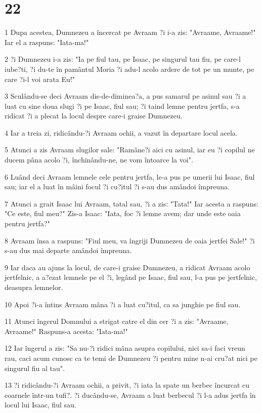 \chapter{22}

\par 1 Dupa acestea, Dumnezeu a încercat pe Avraam ?i i-a zis: "Avraame, Avraame!" Iar el a raspuns: "Iata-ma!"
\par 2 ?i Dumnezeu i-a zis: "Ia pe fiul tau, pe Isaac, pe singurul tau fiu, pe care-l iube?ti, ?i du-te în pamântul Moria ?i adu-l acolo ardere de tot pe un munte, pe care ?i-l voi arata Eu!"
\par 3 Sculându-se deci Avraam dis-de-diminea?a, a pus samarul pe asinul sau ?i a luat cu sine doua slugi ?i pe Isaac, fiul sau; ?i taind lemne pentru jertfa, s-a ridicat ?i a plecat la locul despre care-i graise Dumnezeu.
\par 4 Iar a treia zi, ridicându-?i Avraam ochii, a vazut în departare locul acela.
\par 5 Atunci a zis Avraam slugilor sale: "Ramâne?i aici cu asinul, iar eu ?i copilul ne ducem pâna acolo ?i, închinându-ne, ne vom întoarce la voi".
\par 6 Luând deci Avraam lemnele cele pentru jertfa, le-a pus pe umerii lui Isaac, fiul sau; iar el a luat în mâini focul ?i cu?itul ?i s-au dus amândoi împreuna.
\par 7 Atunci a grait Isaac lui Avraam, tatal sau, ?i a zis: "Tata!" Iar acesta a raspuns: "Ce este, fiul meu?" Zis-a Isaac: "Iata, foc ?i lemne avem; dar unde este oaia pentru jertfa?"
\par 8 Avraam însa a raspuns: "Fiul meu, va îngriji Dumnezeu de oaia jertfei Sale!" ?i s-au dus mai departe amândoi împreuna.
\par 9 Iar daca au ajuns la locul, de care-i graise Dumnezeu, a ridicat Avraam acolo jertfelnic, a a?ezat lemnele pe el ?i, legând pe Isaac, fiul sau, l-a pus pe jertfelnic, deasupra lemnelor.
\par 10 Apoi ?i-a întins Avraam mâna ?i a luat cu?itul, ca sa junghie pe fiul sau.
\par 11 Atunci îngerul Domnului a strigat catre el din cer ?i a zis: "Avraame, Avraame!" Raspuns-a acesta: "Iata-ma!"
\par 12 Iar îngerul a zis: "Sa nu-?i ridici mâna asupra copilului, nici sa-i faci vreun rau, caci acum cunosc ca te temi de Dumnezeu ?i pentru mine n-ai cru?at nici pe singurul fiu al tau".
\par 13 ?i ridicându-?i Avraam ochii, a privit, ?i iata la spate un berbec încurcat cu coarnele într-un tufi?. ?i ducându-se, Avraam a luat berbecul ?i l-a adus jertfa în locul lui Isaac, fiul sau.
